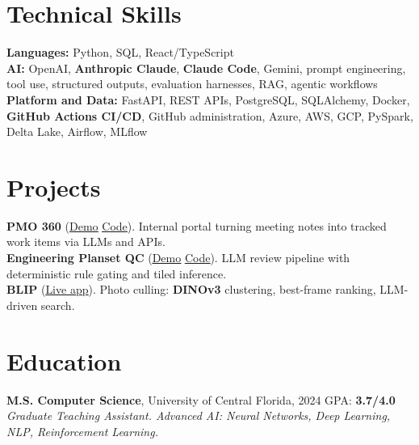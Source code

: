 \documentclass[11pt,letterpaper]{article}
\newcommand{\projgap}{3.5pt}     %
\newcommand{\projectentry}[3]{%
\noindent\textbf{#1} {\small (#2). #3}\\[\projgap]
}
\begin{document}
\section{Technical Skills}

\textbf{Languages:} Python, SQL, React/TypeScript\\[1.5pt]
\textbf{AI:} OpenAI, \textbf{Anthropic Claude}, \textbf{Claude Code}, Gemini,
prompt engineering, tool use, structured outputs, evaluation harnesses, RAG,
agentic workflows\\[1.5pt]
\textbf{Platform and Data:} FastAPI, REST APIs, PostgreSQL, SQLAlchemy, Docker,
\textbf{GitHub Actions CI/CD}, GitHub administration, Azure, AWS, GCP, PySpark,
Delta Lake, Airflow, MLflow

\section{Projects}

\projectentry
{PMO 360}
{\href{https://jayasurya23.github.io/Project-Management-Portal-Demo}{\underline{Demo}}
\;\textbar\;
\href{https://github.com/jayasurya23/Project-Management-Portal-Demo}{\underline{Code}}}
{Internal portal turning meeting notes into tracked work items via LLMs and APIs.}

\projectentry
{Engineering Planset QC}
{\href{https://jayasurya23.github.io/planset-qc-demo/}{\underline{Demo}}
\;\textbar\;
\href{https://github.com/jayasurya23/planset-qc-demo}{\underline{Code}}}
{LLM review pipeline with deterministic rule gating and tiled inference.}

\projectentry
{BLIP}
{\href{https://huggingface.co/spaces/Jayasurya23/photo-culling}{\underline{Live app}}}
{Photo culling: \textbf{DINOv3} clustering, best-frame ranking, LLM-driven search.}

\section{Education}

\textbf{M.S. Computer Science}, University of Central Florida, 2024
\hfill GPA: \textbf{3.7/4.0}\\[1pt]
\textit{Graduate Teaching Assistant. Advanced AI: Neural Networks, Deep
Learning, NLP, Reinforcement Learning.}
\end{document}
